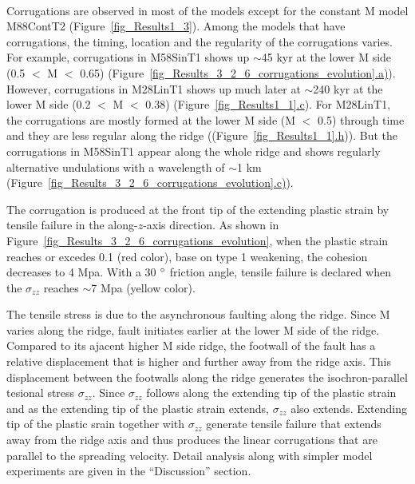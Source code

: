 ~\\
Corrugations are observed in most of the models except for the constant M model M88ContT2 (Figure~\hyperref[fig_Results1_3]{\ref{fig_Results1_3}}). Among the models that have corrugations, the timing, location and the regularity of the corrugations varies. For example, corrugations in M58SinT1 shows up $\sim$45 kyr at the lower M side (0.5 $<$ M $<$ 0.65) (Figure~\hyperref[fig_Results_3_2_6_corrugations_evolution]{\ref{fig_Results_3_2_6_corrugations_evolution}.a)}). However, corrugations in M28LinT1 shows up much later at $\sim$240 kyr at the lower M side (0.2 $<$ M $<$ 0.38) (Figure~\hyperref[fig_Results1_1]{\ref{fig_Results1_1}.c}). For M28LinT1, the corrugations are mostly formed at the lower M side (M $<$ 0.5) through time and they are less regular along the ridge ((Figure~\hyperref[fig_Results1_1]{\ref{fig_Results1_1}.h})). But the corrugations in M58SinT1 appear along the whole ridge and shows regularly alternative undulations with a wavelength of $\sim$1 km (Figure~\hyperref[fig_Results_3_2_6_corrugations_evolution]{\ref{fig_Results_3_2_6_corrugations_evolution}.c)}). 

The corrugation is produced at the front tip of the extending plastic strain by tensile failure in the along-$z$-axis direction. As shown in Figure~\hyperref[fig_Results_3_2_6_corrugations_evolution]{\ref{fig_Results_3_2_6_corrugations_evolution}}, when the plastic strain reaches or excedes 0.1 (red color), base on type 1 weakening, the cohesion decreases to 4 Mpa. With a 30 $\degree$ friction angle, tensile failure is declared when the $\sigma_{zz}$ reaches $\sim$7 Mpa (yellow color).

The tensile stress is due to the asynchronous faulting along the ridge. Since M varies along the ridge, fault initiates earlier at the lower M side of the ridge. Compared to its ajacent higher M side ridge, the footwall of the fault has a relative displacement that is higher and further away from the ridge axis. This displacement between the footwalls along the ridge generates the isochron-parallel tesional stress $\sigma_{zz}$. Since $\sigma_{zz}$ follows along the extending tip of the plastic strain and as the extending tip of the plastic strain extends, $\sigma_{zz}$ also extends. Extending tip of the plastic srain together with $\sigma_{zz}$ generate tensile failure that extends away from the ridge axis and thus produces the linear corrugations that are parallel to the spreading velocity. Detail analysis along with simpler model experiments are given in the ``Discussion'' section.   


